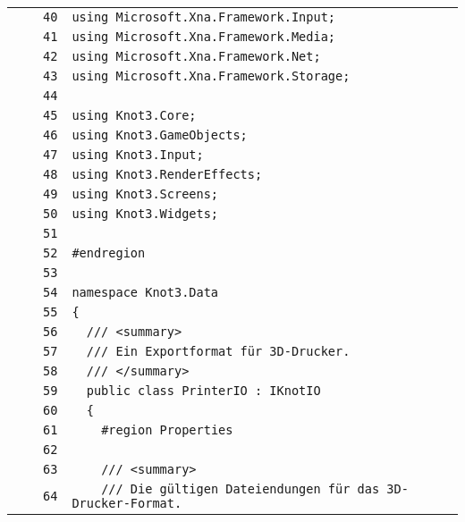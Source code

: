 \documentclass[a4paper,10pt]{article}
\begin{document}
\begin{longtable}[l]{lrrl}
\cellcolor{gray} &  & \verb~40~ & \verb~using Microsoft.Xna.Framework.Input;~\\
\cellcolor{gray} &  & \verb~41~ & \verb~using Microsoft.Xna.Framework.Media;~\\
\cellcolor{gray} &  & \verb~42~ & \verb~using Microsoft.Xna.Framework.Net;~\\
\cellcolor{gray} &  & \verb~43~ & \verb~using Microsoft.Xna.Framework.Storage;~\\
\cellcolor{gray} &  & \verb~44~ & \verb~~\\
\cellcolor{gray} &  & \verb~45~ & \verb~using Knot3.Core;~\\
\cellcolor{gray} &  & \verb~46~ & \verb~using Knot3.GameObjects;~\\
\cellcolor{gray} &  & \verb~47~ & \verb~using Knot3.Input;~\\
\cellcolor{gray} &  & \verb~48~ & \verb~using Knot3.RenderEffects;~\\
\cellcolor{gray} &  & \verb~49~ & \verb~using Knot3.Screens;~\\
\cellcolor{gray} &  & \verb~50~ & \verb~using Knot3.Widgets;~\\
\cellcolor{gray} &  & \verb~51~ & \verb~~\\
\cellcolor{gray} &  & \verb~52~ & \verb~#endregion~\\
\cellcolor{gray} &  & \verb~53~ & \verb~~\\
\cellcolor{gray} &  & \verb~54~ & \verb~namespace Knot3.Data~\\
\cellcolor{gray} &  & \verb~55~ & \verb~{~\\
\cellcolor{gray} &  & \verb~56~ & \verb~  /// <summary>~\\
\cellcolor{gray} &  & \verb~57~ & \verb~  /// Ein Exportformat für 3D-Drucker.~\\
\cellcolor{gray} &  & \verb~58~ & \verb~  /// </summary>~\\
\cellcolor{gray} &  & \verb~59~ & \verb~  public class PrinterIO : IKnotIO~\\
\cellcolor{gray} &  & \verb~60~ & \verb~  {~\\
\cellcolor{gray} &  & \verb~61~ & \verb~    #region Properties~\\
\cellcolor{gray} &  & \verb~62~ & \verb~~\\
\cellcolor{gray} &  & \verb~63~ & \verb~    /// <summary>~\\
\cellcolor{gray} &  & \verb~64~ & \verb~    /// Die gültigen Dateiendungen für das 3D-Drucker-Format.~\\

\end{longtable}
\end{document}
